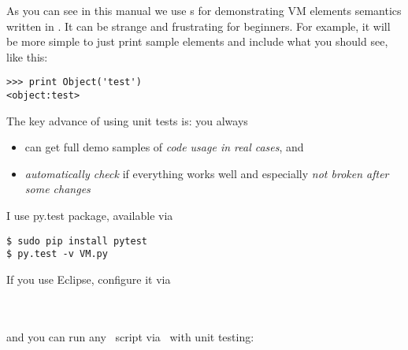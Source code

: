 \clearpage{}\label{pytest}

As you can see in this manual we use s for demonstrating VM
elements semantics written in \py. It can be strange and frustrating for
beginners. For example, it will be more simple to just print sample elements and
include what you should see, like this:
\begin{lstlisting}
>>> print Object('test')
<object:test>
\end{lstlisting}

\noindent
The key advance of using unit tests is: you always
\begin{itemize}[nosep]
  \item 
can get full demo samples of \emph{code usage in real cases}, and
  \item 
\emph{automatically check} if everything works well and especially \emph{not
broken after some changes}
\end{itemize}

\noindent
I use py.test package, available via
\begin{lstlisting}
$ sudo pip install pytest
$ py.test -v VM.py
\end{lstlisting}
If you use Eclipse, configure it via\\
\\
\\

\medskip\noindent
and you can run any \py\ script via \ with unit testing:\\
